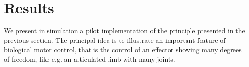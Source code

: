 \documentclass[runningheads]{llncs}
\begin{document}





\section{Results}

We present in simulation a pilot implementation of the principle presented in the previous section. The principal idea is to illustrate an important feature of biological motor control, that is the control of an effector showing many degrees of freedom, like e.g. an articulated limb with many joints. 
\end{document}
